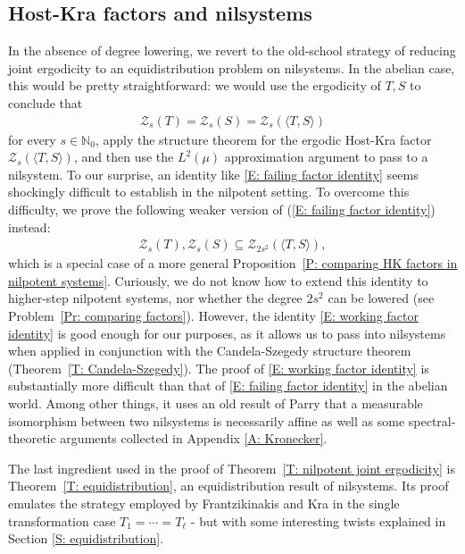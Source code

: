 \documentclass[11pt]{amsart}
\theoremstyle{definition}
\newcommand{\N}{{\mathbb N}}
\newcommand{\CZ}{{\mathcal Z}}
\newcommand{\1}{{\mathbf{1}}}
\begin{document}
\subsection{Host-Kra factors and nilsystems}
In the absence of degree lowering, we revert to the old-school strategy of reducing joint ergodicity to an equidistribution problem on nilsystems. In the abelian case, this would be pretty straightforward: we would use the ergodicity of $T, S$ to conclude that
\begin{align}\label{E: failing factor identity}
\CZ_s(T)=\CZ_s(S) = \CZ_s(\langle T, S\rangle)    
\end{align}
 for every $s\in\N_0$, apply the structure theorem for the ergodic Host-Kra factor $\CZ_s(\langle T, S\rangle)$, and then use the $L^2(\mu)$ approximation argument to pass to a nilsystem. To our surprise, an identity like \eqref{E: failing factor identity} seems shockingly difficult to establish in the nilpotent setting. 
 To overcome this difficulty,  we prove  the following weaker version of (\ref{E: failing factor identity}) instead:
 \begin{align}\label{E: working factor identity}
 \CZ_s(T), \CZ_s(S)\subseteq \CZ_{2s^2}(\langle T, S\rangle),    
 \end{align}
 which is a special case of a more general Proposition~\ref{P: comparing HK factors in nilpotent systems}. Curiously, we do not know how to extend this identity to higher-step nilpotent systems, nor whether the degree $2s^2$ can be lowered (see Problem~\ref{Pr: comparing factors}). However, the identity \eqref{E: working factor identity} is good enough for our purposes, as it allows us to pass into nilsystems when applied in conjunction with the Candela-Szegedy structure theorem (Theorem~\ref{T: Candela-Szegedy}). The proof of \eqref{E: working factor identity} is substantially more difficult than that of \eqref{E: failing factor identity} in the abelian world. Among other things, it uses an old result of Parry that a measurable isomorphism between two nilsystems is necessarily affine as well as some spectral-theoretic arguments collected in Appendix \ref{A: Kronecker}.




The last ingredient used in the proof of Theorem~\ref{T: nilpotent joint ergodicity} is Theorem~\ref{T: equidistribution}, an equidistribution result of nilsystems. Its proof emulates the strategy employed by Frantzikinakis and Kra \cite{FrKr05} in the single transformation case $T_1 = \cdots = T_\ell$ - but with some interesting twists explained in Section \ref{S: equidistribution}. 
\end{document}
